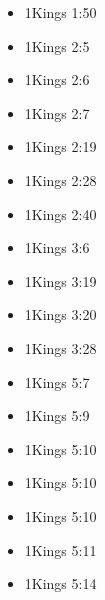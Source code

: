 \documentclass[14pt]{article}
\begin{document}
			\begin{multicols}{2}\begin{itemize}
							
							\item 1Kings 1:50
							
							\item 1Kings 2:5
							
							\item 1Kings 2:6
							
							\item 1Kings 2:7
							
							\item 1Kings 2:19
							
							\item 1Kings 2:28
									
									\item 1Kings 2:40
									
									\item 1Kings 3:6
									
									\item 1Kings 3:19
									
									\item 1Kings 3:20
									
									\item 1Kings 3:28
									
									\item 1Kings 5:7
									
									\item 1Kings 5:9
									
									\item 1Kings 5:10
									
									\item 1Kings 5:10
									
									\item 1Kings 5:10
									
									\item 1Kings 5:11
									
									\item 1Kings 5:14
									

\end{itemize}
\end{multicols}
\end{document}

